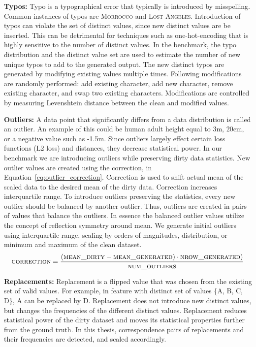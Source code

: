 \textbf{Typos:} 
Typo is a typographical error that typically is introduced by misspelling. 
Common instances of typos are \textsc{Morrocco} and \textsc{Lost Angeles}. 
Introduction of typos can violate the set of distinct values, since new distinct values are be inserted.
This can be detrimental for techniques such as one-hot-encoding that is highly sensitive to the number of distinct values.
In the benchmark, the typo distribution and the distinct value set are used to estimate the number of new unique typos to add to the generated output. 
The new distinct typos are generated by modifying existing values multiple times.
Following modifications are randomly performed: add existing character, add new character, remove existing character, and swap two existing characters.
Modifications are controlled by measuring Levenshtein distance between the clean and modified values. 

\textbf{Outliers:} 
A data point that significantly differs from a data distribution is called an outlier.
An example of this could be human adult height equal to 3m, 20cm, or a negative value such as -1.5m. 
Since outliers largely effect certain loss functions (L2 loss) and distances, they decrease statistical power.
In our benchmark we are introducing outliers while preserving dirty data statistics. 
New outlier values are created using the correction, in Equation~\ref{eq:outlier_correction}. 
Correction is used to shift actual mean of the scaled data to the desired mean of the dirty data.
Correction increases interquartile range.
To introduce outliers preserving the statistics, every new outlier should be balanced by another outlier. Thus, outliers are created in pairs of values that balance the outliers. 
In essence the balanced outlier values utilize the concept of reflection symmetry around mean.  
We generate initial outliers using interquartile range, scaling by orders of magnitudes, distribution, or minimum and maximum of the clean dataset.
\begin{equation}
\label{eq:outlier_correction}
\textsc{correction} = \frac{(\textsc{mean\_dirty} - \textsc{mean\_generated}) \cdot \textsc{nrow\_generated})}{\textsc{num\_outliers}}
\end{equation}

\textbf{Replacements:} 
Replacement is a flipped value that was chosen from the existing set of valid values. 
For example, in feature with distinct set of values \textsc{\{A, B, C, D\}}, \textsc{A} can be replaced by \textsc{D}. 
Replacement does not introduce new distinct values, but changes the frequencies of the different distinct values. 
Replacement reduces statistical power of the dirty dataset and moves its statistical properties further from the ground truth.
In this thesis, correspondence pairs of replacements and their frequencies are detected, and scaled accordingly. 

